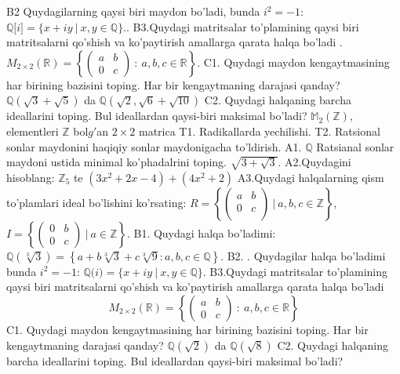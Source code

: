 B2 Quydagilarning qaysi biri maydon bo'ladi, bunda \(i^{2} = - 1\):
\(\mathbb{Q\lbrack}i\rbrack = \{ x + iy\ |\ x,y \in \mathbb{Q\}}\)..
B3.Quydagi matritsalar to'plamining qaysi biri matritsalarni qo'shish va ko'paytirish amallarga qarata halqa bo'ladi .
\(M_{2 \times 2}\mathbb{(R) =}\left\{ \begin{pmatrix}
a & b \\
0 & c
\end{pmatrix}\ :\ a,b,c \in \mathbb{R} \right\}\).
C1. Quydagi maydon kengaytmasining har birining bazisini toping. Har bir kengaytmaning darajasi qanday?
\(\mathbb{Q}\left( \sqrt{3} + \sqrt{5} \right)\) da \(\mathbb{Q}\left( \sqrt{2},\sqrt{6} + \sqrt{10} \right)\)
C2. Quydagi halqaning barcha ideallarini toping. Bul ideallardan qaysi-biri maksimal bo'ladi?
\(\mathbb{M}_{2}\left( \mathbb{Z} \right)\), elementleri \(\mathbb{Z}\) bol\(g'\)an \(2 \times 2\) matrica
T1. Radikallarda yechilishi.
T2. Ratsional sonlar maydonini haqiqiy sonlar maydonigacha to'ldirish.
A1. \(\mathbb{Q}\) Ratsianal sonlar maydoni ustida minimal ko'phadalrini toping.
\(\sqrt{3 + \sqrt{3}}\).
A2.Quydagini hisoblang:
\(\mathbb{Z}_{5}\) te \(\left( 3x^{2} + 2x - 4 \right) + \left( 4x^{2} + 2 \right)\)
A3.Quydagi halqalarning qism to'plamlari ideal bo'lishini ko'rsating: \(R = \left\{ \begin{pmatrix}
a & b \\
0 & c \\
 & 
\end{pmatrix}\ |\ a,b,c \in \mathbb{Z} \right\}\), \(I = \left\{ \begin{pmatrix}
0 & b \\
0 & c
\end{pmatrix}\ |\ a \in \mathbb{Z} \right\}\).
B1. Quydagi halqa bo'ladimi:
\(\mathbb{Q}\left( \sqrt[3]{3} \right) = \left\{ a + b\sqrt[3]{3} + c\sqrt[3]{9}:a,b,c \in \mathbb{Q} \right\}\).
B2. . Quydagilar halqa bo'ladimi bunda \(i^{2} = - 1\):
\(\mathbb{Q(}i) = \{ x + iy\ |\ x,y \in \mathbb{Q\}}\).
B3.Quydagi matritsalar to'plamining qaysi biri matritsalarni qo'shish va ko'paytirish amallarga qarata halqa bo'ladi
\[M_{2 \times 2}\mathbb{(R) =}\left\{ \begin{pmatrix}
a & b \\
0 & c
\end{pmatrix}\ :\ a,b,c \in \mathbb{R} \right\}\]
C1. Quydagi maydon kengaytmasining har birining bazisini toping. Har bir kengaytmaning darajasi qanday?
\(\mathbb{Q}\left( \sqrt{2} \right)\) da \(\mathbb{Q}\left( \sqrt{8} \right)\)
C2. Quydagi halqaning barcha ideallarini toping. Bul ideallardan qaysi-biri maksimal bo'ladi?
